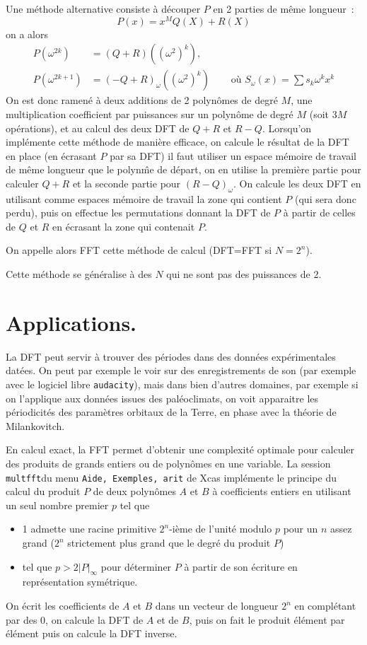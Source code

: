 \documentclass[a4paper,11pt]{book}
\begin{document}
\begin{giacjshere}
Une m\'ethode alternative consiste \`a 
d\'ecouper $P$ en 2 parties de m\^eme longueur~:
\[ P(x)=x^M Q(X) + R(X) \]
on a alors
\begin{eqnarray*}
P(\omega^{2k}) &= (Q+R) ((\omega^2)^{k}), \\
P(\omega^{2k+1}) &= (-Q +R)_\omega ((\omega^2)^k) \quad
&\mbox{ o\`u }  S_\omega(x)=\sum s_k \omega^k x^k
\end{eqnarray*}
On est donc ramen\'e \`a deux additions de 2 polyn\^omes de degr\'e $M$,
une multiplication coefficient par puissances sur un polyn\^ome de
degr\'e $M$ (soit $3M$ op\'erations),
et au calcul des deux DFT de $Q+R$ et $R-Q$. 
Lorsqu'on impl\'emente cette m\'ethode de mani\`ere efficace, 
on calcule le r\'esultat de la DFT en place (en \'ecrasant $P$ par sa DFT)
il faut utiliser un espace m\'emoire
de travail de m\^eme longueur que le polyn\^me de d\'epart, on en
utilise la premi\`ere partie pour calculer $Q+R$ et la seconde partie
pour $(R-Q)_\omega$. On calcule les deux DFT en utilisant comme
espaces m\'emoire de travail la zone qui contient $P$ (qui sera donc
perdu), puis on effectue les permutations donnant la DFT de $P$
\`a partir de celles de $Q$ et $R$ en \'ecrasant la zone qui contenait $P$.

On appelle alors FFT cette méthode de calcul (DFT=FFT si $N=2^n$).

Cette m\'ethode se g\'en\'eralise \`a des $N$ qui ne sont pas des puissances
de 2.

\section{Applications.}
La DFT peut servir \`a trouver des p\'eriodes dans des donn\'ees
exp\'erimentales dat\'ees. On peut par exemple le voir sur
des enregistrements de son (par exemple avec le logiciel
libre \verb|audacity|), mais dans bien d'autres
domaines, par exemple si on l'applique aux donn\'ees
issues des pal\'eoclimats, on voit apparaitre les p\'eriodicit\'es
des param\`etres orbitaux de la Terre, en phase avec la th\'eorie
de Milankovitch.

En calcul exact, la FFT permet d'obtenir une complexit\'e optimale
pour calculer des produits de grands entiers ou de polyn\^omes
en une variable. La session \verb|multfft|du menu 
\verb|Aide, Exemples, arit| de Xcas impl\'emente le principe
du calcul du produit $P$ de deux polyn\^omes $A$ et $B$ \`a coefficients entiers
en utilisant un seul nombre premier $p$ tel que 
\begin{itemize}
\item 1 admette
une racine primitive $2^n$-i\`eme de l'unit\'e modulo $p$ 
pour un $n$ assez grand ($2^n$ strictement plus grand que le degr\'e
du produit $P$) 
\item tel que $p>2|P|_\infty$ pour d\'eterminer $P$ \`a partir de son
\'ecriture en repr\'esentation sym\'etrique.
\end{itemize}
On \'ecrit les coefficients de $A$ et $B$ dans un vecteur de longueur
$2^n$ en compl\'etant par des 0, on calcule la DFT de $A$ et de $B$,
puis on fait le produit \'el\'ement par \'el\'ement puis on calcule la
DFT inverse.


\end{giacjshere}
\end{document}
